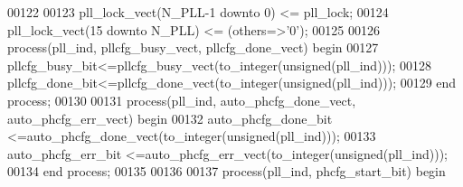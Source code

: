 \begin{DoxyCode}
00122 
00123 \textcolor{vhdlchar}{pll_lock_vect}\textcolor{vhdlchar}{(}\textcolor{vhdlchar}{N_PLL}\textcolor{vhdlchar}{-}\textcolor{vhdllogic}{}\textcolor{vhdllogic}{1} \textcolor{keywordflow}{downto} \textcolor{vhdllogic}{}\textcolor{vhdllogic}{0}\textcolor{vhdlchar}{)}        \textcolor{vhdlchar}{<=} \textcolor{vhdlchar}{pll_lock};
00124 \textcolor{vhdlchar}{pll_lock_vect}\textcolor{vhdlchar}{(}\textcolor{vhdllogic}{}\textcolor{vhdllogic}{15} \textcolor{keywordflow}{downto} \textcolor{vhdlchar}{N_PLL}\textcolor{vhdlchar}{)}         \textcolor{vhdlchar}{<=} \textcolor{vhdlchar}{(}\textcolor{keywordflow}{others}\textcolor{vhdlchar}{=}\textcolor{vhdlchar}{>}\textcolor{vhdlchar}{'}\textcolor{vhdllogic}{}\textcolor{vhdllogic}{0}\textcolor{vhdlchar}{'}\textcolor{vhdlchar}{)};
00125 
00126 \textcolor{keywordflow}{process}(pll_ind, pllcfg_busy_vect, pllcfg_done_vect) \textcolor{keywordflow}{begin}
00127     \textcolor{vhdlchar}{pllcfg_busy_bit}\textcolor{vhdlchar}{<=}\textcolor{vhdlchar}{pllcfg_busy_vect}\textcolor{vhdlchar}{(}\textcolor{vhdlchar}{to\_integer}\textcolor{vhdlchar}{(}\textcolor{comment}{unsigned}\textcolor{vhdlchar}{(}\textcolor{vhdlchar}{pll_ind}\textcolor{vhdlchar}{)}\textcolor{vhdlchar}{)}\textcolor{vhdlchar}{)};
00128     \textcolor{vhdlchar}{pllcfg_done_bit}\textcolor{vhdlchar}{<=}\textcolor{vhdlchar}{pllcfg_done_vect}\textcolor{vhdlchar}{(}\textcolor{vhdlchar}{to\_integer}\textcolor{vhdlchar}{(}\textcolor{comment}{unsigned}\textcolor{vhdlchar}{(}\textcolor{vhdlchar}{pll_ind}\textcolor{vhdlchar}{)}\textcolor{vhdlchar}{)}\textcolor{vhdlchar}{)};
00129 \textcolor{keywordflow}{end} \textcolor{keywordflow}{process};
00130 
00131 \textcolor{keywordflow}{process}(pll_ind, auto_phcfg_done_vect, auto_phcfg_err_vect) \textcolor{keywordflow}{begin}
00132     \textcolor{vhdlchar}{auto_phcfg_done_bit}  \textcolor{vhdlchar}{<=}\textcolor{vhdlchar}{auto_phcfg_done_vect}\textcolor{vhdlchar}{(}\textcolor{vhdlchar}{to\_integer}\textcolor{vhdlchar}{(}\textcolor{comment}{unsigned}\textcolor{vhdlchar}{(}\textcolor{vhdlchar}{pll_ind}\textcolor{vhdlchar}{)}\textcolor{vhdlchar}{)}\textcolor{vhdlchar}{)};
00133     \textcolor{vhdlchar}{auto_phcfg_err_bit}   \textcolor{vhdlchar}{<=}\textcolor{vhdlchar}{auto_phcfg_err_vect}\textcolor{vhdlchar}{(}\textcolor{vhdlchar}{to\_integer}\textcolor{vhdlchar}{(}\textcolor{comment}{unsigned}\textcolor{vhdlchar}{(}\textcolor{vhdlchar}{pll_ind}\textcolor{vhdlchar}{)}\textcolor{vhdlchar}{)}\textcolor{vhdlchar}{)};
00134 \textcolor{keywordflow}{end} \textcolor{keywordflow}{process};
00135 
00136 
00137 \textcolor{keywordflow}{process}(pll_ind, phcfg_start_bit) \textcolor{keywordflow}{begin}

\end{DoxyCode}

